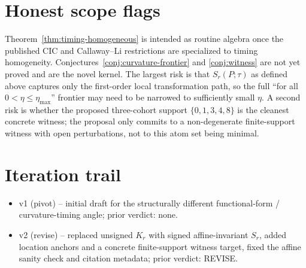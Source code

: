 \documentclass[11pt]{article}
\theoremstyle{definition}
\theoremstyle{plain}
\theoremstyle{remark}
\begin{document}
\section{Honest scope flags}
Theorem~\ref{thm:timing-homogeneous} is intended as routine algebra once the
published CIC and Callaway--Li restrictions are specialized to timing
homogeneity.  Conjectures~\ref{conj:curvature-frontier} and \ref{conj:witness}
are not yet proved and are the novel kernel.  The largest risk is that
\(S_r(P;\tau)\) as defined above captures only the first-order local
transformation path, so the full ``for all \(0<\eta\le\eta_{\max}\)'' frontier
may need to be narrowed to sufficiently small \(\eta\).  A second risk is whether
the proposed three-cohort support \(\{0,1,3,4,8\}\) is the cleanest concrete
witness; the proposal only commits to a non-degenerate finite-support witness
with open perturbations, not to this atom set being minimal.

\section{Iteration trail}
\begin{itemize}[leftmargin=*]
\item v1 (pivot) -- initial draft for the structurally different
functional-form / curvature-timing angle; prior verdict: none.
\item v2 (revise) -- replaced unsigned \(K_r\) with signed affine-invariant
\(S_r\), added location anchors and a concrete finite-support witness target,
fixed the affine sanity check and citation metadata; prior verdict: REVISE.
\end{itemize}
\end{document}
